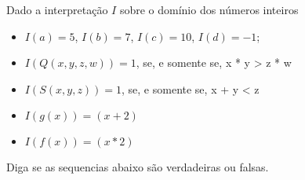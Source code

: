 
\question[10]

Dado a interpretação $I$ sobre o domínio dos números inteiros 

\begin{itemize}
	\item $I(a) = 5$, $I(b) = 7$, $I(c) = 10$, $I(d) = -1$;
	\item $I(Q(x, y, z, w)) = 1$, se, e somente se, x * y > z * w 
	\item $I(S(x, y, z)) = 1$, se, e somente se, x + y < z
	\item $I(g(x)) = (x + 2)$
	\item $I(f(x)) = (x * 2)$
\end{itemize}

Diga se as sequencias abaixo são verdadeiras ou falsas.

